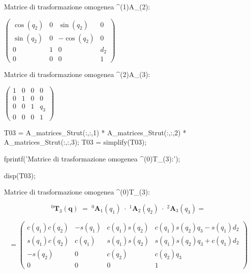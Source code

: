 \documentclass[11pt, a4paper]{article}
\begin{document}
\begin{matlaboutput}
Matrice di trasformazione omogenea ^(1)A_(2):
\end{matlaboutput}
\begin{matlabsymbolicoutput}
$\displaystyle \left(\begin{array}{cccc}
\cos \left(q_2 \right) & 0 & \sin \left(q_2 \right) & 0\\
\sin \left(q_2 \right) & 0 & -\cos \left(q_2 \right) & 0\\
0 & 1 & 0 & d_2 \\
0 & 0 & 0 & 1
\end{array}\right)$
\end{matlabsymbolicoutput}
\begin{matlaboutput}
Matrice di trasformazione omogenea ^(2)A_(3):
\end{matlaboutput}
\begin{matlabsymbolicoutput}
$\displaystyle \left(\begin{array}{cccc}
1 & 0 & 0 & 0\\
0 & 1 & 0 & 0\\
0 & 0 & 1 & q_3 \\
0 & 0 & 0 & 1
\end{array}\right)$
\end{matlabsymbolicoutput}
\newpage
\begin{matlabcode}
T03 = A_matrices_Strut(:,:,1) * A_matrices_Strut(:,:,2) * A_matrices_Strut(:,:,3);
T03 = simplify(T03);

fprintf('Matrice di trasformazione omogenea ^(0)T_(3):\n');

disp(T03);
\end{matlabcode}
\begin{matlaboutput}
Matrice di trasformazione omogenea ^(0)T_(3):
\end{matlaboutput}
\[
    ^{0}\mathbf{T}_{3}(\mathbf{q}) \; = \; ^{0}\mathbf{A}_{1}(q_{1}) \; \cdot \; ^{1}\mathbf{A}_{2}(q_{2}) \; \cdot \; ^{2}\mathbf{A}_{3}(q_{3}) =
\]

\[
    =
    \begin{pmatrix}
        c(q_{1})c(q_{2}) & -s(q_{1}) & c(q_{1})s(q_{2}) & c(q_{1})s(q_{2})q_{3} - s(q_{1})d_{2} \\
        s(q_{1})c(q_{2}) & c(q_{1}) & s(q_{1})s(q_{2}) & s(q_{1})s(q_{2})q_{3} + c(q_{1})d_{2}\\
        -s(q_{2}) & 0 & c(q_{2}) & c(q_{2})q_{3}\\
        0 & 0 & 0 & 1
    \end{pmatrix}
\]
\end{document}
